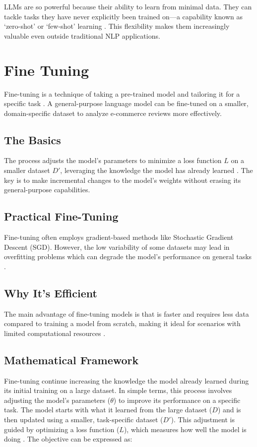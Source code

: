 LLMs are so powerful because their ability to learn from minimal data. They can tackle tasks they have never explicitly been trained on—a capability known as `zero-shot' or `few-shot' learning \citep{naveed2024comprehensive}. This flexibility makes them increasingly valuable even outside traditional NLP applications.

\section{Fine Tuning} %
Fine-tuning is a technique of taking a pre-trained model and tailoring it for a specific task \citep{Zhang2022Fine-Tuning}. A general-purpose language model can be fine-tuned on a smaller, domain-specific dataset to analyze e-commerce reviews more effectively.

\subsection{The Basics}
The process adjusts the model's parameters to minimize a loss function \(L\) on a smaller dataset \(D'\), leveraging the knowledge the model has already learned \citep{Lalor2017Improving}. The key is to make incremental changes to the model's weights without erasing its general-purpose capabilities.

\subsection{Practical Fine-Tuning}
Fine-tuning often employs gradient-based methods like Stochastic Gradient Descent (SGD). However, the low variability of some datasets may lead in overfitting problems which can degrade the model's performance on general tasks \citep{Catani2020A}.

\subsection{Why It's Efficient}
The main advantage of fine-tuning models is that is faster and requires less data compared to training a model from scratch, making it ideal for scenarios with limited computational resources \citep{Xiao2023Offsite-Tuning:}.

\subsection{Mathematical Framework}
Fine-tuning continue increasing the knowledge the model already learned during its initial training on a large dataset. In simple terms, this process involves adjusting the model's parameters ($\theta$) to improve its performance on a specific task. The model starts with what it learned from the large dataset ($D$) and is then updated using a smaller, task-specific dataset ($D'$). This adjustment is guided by optimizing a loss function ($L$), which measures how well the model is doing \citep{Liu2023Improving}. The objective can be expressed as:

